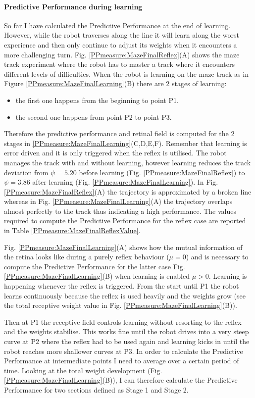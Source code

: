 \paragraph{Predictive Performance during learning} So far I have calculated the
Predictive Performance at the end of learning. However, while the robot traverses
along the line it will learn along the worst experience and then only continue to
adjust its weights when it encounters a more challenging turn. 
Fig. \ref{PPmeasure:MazeFinalReflex}(A)
shows the maze track experiment where the robot has to master a track 
where it encounters different levels of difficulties.
When the robot is learning on the maze track as in Figure \ref{PPmeasure:MazeFinalLearning}(B)
there are 2 stages of learning:
\begin{itemize}
\item the first one happens from the beginning to point P1.
\item the second one happens from point P2 to point P3.
\end{itemize}

Therefore the predictive performance and retinal field is computed for the 
2 stages in \ref{PPmeasure:MazeFinalLearning}(C,D,E,F).
Remember that learning is error driven and it is only triggered when the reﬂex is utilised.
The robot manages the track with and without learning, however learning reduces the track deviation from
$\psi = 5.20$ before learning (Fig. \ref{PPmeasure:MazeFinalReflex}) to 
$\psi = 3.86$ after learning (Fig. \ref{PPmeasure:MazeFinalLearning}).
In Fig. \ref{PPmeasure:MazeFinalReflex}(A) the trajectory is approximated by a
broken line whereas in Fig. \ref{PPmeasure:MazeFinalLearning}(A) 
the trajectory overlaps almost perfectly to the track thus indicating a high performance.
The values required to compute the Predictive Performance for the reflex case
are reported in Table \ref{PPmeasure:MazeFinalReflexValue}.

Fig. \ref{PPmeasure:MazeFinalLearning}(A) shows how the mutual information of the
retina looks like during a purely reflex behaviour ($\mu=0$) and is necessary to compute
the Predictive Performance for the latter case Fig. \ref{PPmeasure:MazeFinalLearning}(B)
when learning is enabled $\mu>0$. 
Learning is happening whenever the reﬂex is triggered. From the start until P1 
the robot learns continuously because the reﬂex is used heavily and the weights grow (see the total receptive
weight value in Fig. \ref{PPmeasure:MazeFinalLearning}(B)).

Then at P1 the receptive field controls learning without
resorting to the reﬂex and the weights stabilise. This works fine until the robot
drives into a very steep curve at P2 where the reﬂex had to be used again and
learning kicks in until the robot reaches more shallower curves at P3.
In order to calculate the Predictive Performance at intermediate points I
need to average over a certain period of time.
Looking at the total weight development (Fig. \ref{PPmeasure:MazeFinalLearning}(B)),
I can therefore calculate the Predictive Performance for two sections defined 
as Stage 1 and Stage 2. 

